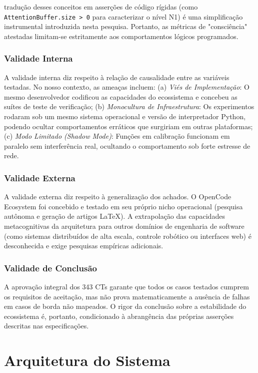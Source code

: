 \documentclass[12pt,a4paper,oneside]{abntex2}
\begin{document}
tradução desses conceitos em asserções de código rígidas (como \texttt{AttentionBuffer.size > 0} para caracterizar o nível N1) é uma simplificação instrumental introduzida nesta pesquisa. Portanto, as métricas de "consciência" atestadas limitam-se estritamente aos comportamentos lógicos programados.

\subsection{Validade Interna}

A validade interna diz respeito à relação de causalidade entre as variáveis testadas. No nosso contexto, as ameaças incluem: (a) \textit{Viés de Implementação}: O mesmo desenvolvedor codificou as capacidades do ecossistema e concebeu as suítes de teste de verificação; (b) \textit{Monocultura de Infraestrutura}: Os experimentos rodaram sob um mesmo sistema operacional e versão de interpretador Python, podendo ocultar comportamentos erráticos que surgiriam em outras plataformas; (c) \textit{Modo Limitado (Shadow Mode)}: Funções em calibração funcionam em paralelo sem interferência real, ocultando o comportamento sob forte estresse de rede.

\subsection{Validade Externa}

A validade externa diz respeito à generalização dos achados. O OpenCode Ecosystem foi concebido e testado em seu próprio nicho operacional (pesquisa autônoma e geração de artigos LaTeX). A extrapolação das capacidades metacognitivas da arquitetura para outros domínios de engenharia de software (como sistemas distribuídos de alta escala, controle robótico ou interfaces web) é desconhecida e exige pesquisas empíricas adicionais.

\subsection{Validade de Conclusão}

A aprovação integral dos 343 CTs garante que todos os casos testados cumprem os requisitos de aceitação, mas não prova matematicamente a ausência de falhas em casos de borda não mapeados. O rigor da conclusão sobre a estabilidade do ecossistema é, portanto, condicionado à abrangência das próprias asserções descritas nas especificações.

\chapter{Arquitetura do Sistema}
\label{ch:arquitetura}
\end{document}
